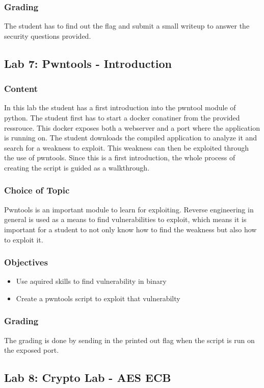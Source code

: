 \subsubsection*{Grading}
The student has to find out the flag and submit a small writeup to answer the security questions provided.


\subsection{Lab 7: Pwntools - Introduction}
\subsubsection*{Content}
In this lab the student has a first introduction into the pwntool module of python. The student first has to start a docker conatiner from the provided ressrouce. This docker exposes both a webserver and a port where the application is running on. The student downloads the compiled application to analyze it and search for a weakness to exploit. This weakness can then be exploited through the use of pwntools. Since this is a first introduction, the whole process of creating the script is guided as a walkthrough.
\subsubsection*{Choice of Topic}
Pwntools is an important module to learn for exploiting. Reverse engineering in general is used as a means to find vulnerabilities to exploit, which means it is important for a student to not only know how to find the weakness but also how to exploit it.
\subsubsection*{Objectives}
\begin{itemize}
    \item Use aquired skills to find vulnerability in binary
    \item Create a pwntools script to exploit that vulnerabilty
\end{itemize}
\subsubsection*{Grading}
The grading is done by sending in the printed out flag when the script is run on the exposed port.

\subsection{Lab 8: Crypto Lab - AES ECB}
